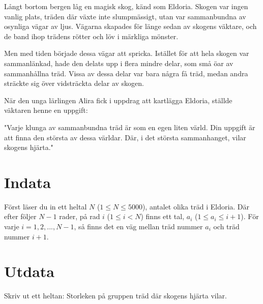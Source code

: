 Långt bortom bergen låg en magisk skog, känd som Eldoria. Skogen var ingen vanlig plats, träden där växte inte slumpmässigt, utan var sammanbundna av osynliga vägar av ljus. Vägarna skapades för länge sedan av skogens väktare, och de band ihop trädens rötter och löv i märkliga mönster.

Men med tiden började dessa vägar att spricka. Istället för att hela skogen var sammanlänkad, hade den delats upp i flera mindre delar, som små öar av sammanhållna träd. Vissa av dessa delar var bara några få träd, medan andra sträckte sig över vidsträckta delar av skogen.

När den unga lärlingen Alira fick i uppdrag att kartlägga Eldoria, ställde väktaren henne en uppgift:

"Varje klunga av sammanbundna träd är som en egen liten värld. Din uppgift är att finna den största av dessa världar. Där, i det största sammanhanget, vilar skogens hjärta."

\section*{Indata}
Först läser du in ett heltal $N$ ($1 \leq N \leq 5000$), antalet olika träd i Eldoria.
Där efter följer $N - 1$ rader, på rad $i$ ($1 \leq i < N$) finns ett tal, $a_i$ ($1 \leq a_i \leq i + 1$). För varje $i = 1, 2, ..., N - 1$, så finns det en väg mellan träd nummer $a_i$ och träd nummer $i + 1$.

\section*{Utdata}
Skriv ut ett heltan: Storleken på gruppen träd där skogens hjärta vilar.